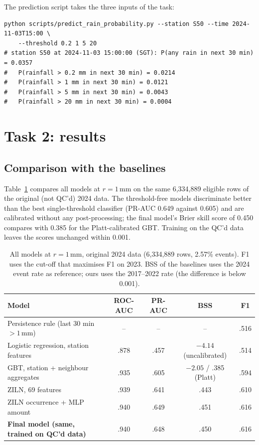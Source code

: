 \documentclass[lang=en,11pt,a4paper,bibend=bibtex]{elegantpaper}
\newcommand{\mm}{\,mm}
\newcommand{\FinalOrigROC}{.940}
\newcommand{\FinalOrigPR}{.648}
\newcommand{\FinalOrigBSS}{.450}
\newcommand{\FinalOrigFone}{.616}
\begin{document}
The prediction script takes the three inputs of the task:
\begin{lstlisting}[basicstyle=\footnotesize\ttfamily]
python scripts/predict_rain_probability.py --station S50 --time 2024-11-03T15:00 \
    --threshold 0.2 1 5 20
# station S50 at 2024-11-03 15:00:00 (SGT): P(any rain in next 30 min) = 0.0357
#   P(rainfall > 0.2 mm in next 30 min) = 0.0214
#   P(rainfall > 1 mm in next 30 min) = 0.0121
#   P(rainfall > 5 mm in next 30 min) = 0.0043
#   P(rainfall > 20 mm in next 30 min) = 0.0004
\end{lstlisting}

\section{Task 2: results}\label{sec:results}
\subsection{Comparison with the baselines}
Table~\ref{tab:compare} compares all models at $r=1$\mm{} on the same 6,334,889 eligible rows of the original (not QC'd) 2024 data. The threshold-free models discriminate better than the best single-threshold classifier (PR-AUC 0.649 against 0.605) and are calibrated without any post-processing; the final model's Brier skill score of 0.450 compares with 0.385 for the Platt-calibrated GBT. Training on the QC'd data leaves the scores unchanged within 0.001.

\begin{table}[H]
\centering\small
\caption{All models at $r=1$\mm, original 2024 data (6,334,889 rows, 2.57\% events). F1 uses the cut-off that maximises F1 on 2023. BSS of the baselines uses the 2024 event rate as reference; ours uses the 2017--2022 rate (the difference is below 0.001).}\label{tab:compare}
\renewcommand{\arraystretch}{1.15}
\begin{tabular*}{\linewidth}{@{\extracolsep{\fill}}lcccc@{}}
\toprule
\textbf{Model} & \textbf{ROC-AUC} & \textbf{PR-AUC} & \textbf{BSS} & \textbf{F1} \\
\midrule
Persistence rule (last 30 min $>1$\mm) & -- & -- & -- & .516 \\
Logistic regression, station features & .878 & .457 & $-4.14$ (uncalibrated) & .514 \\
GBT, station + neighbour aggregates & .935 & .605 & $-2.05$ / .385 (Platt) & .594 \\
ZILN, 69 features & .939 & .641 & .443 & .610 \\
ZILN occurrence + MLP amount & .940 & .649 & .451 & .616 \\
\textbf{Final model (same, trained on QC'd data)} & \FinalOrigROC & \FinalOrigPR & \FinalOrigBSS & \FinalOrigFone \\
\bottomrule
\end{tabular*}
\end{table}
\end{document}
